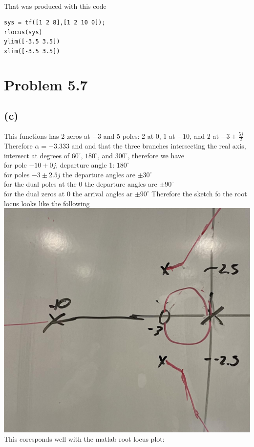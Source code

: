 \documentclass[12pt]{article}
\begin{document}
\\That was produced with this code
\begin{verbatim}
sys = tf([1 2 8],[1 2 10 0]);
rlocus(sys)
ylim([-3.5 3.5])
xlim([-3.5 3.5])
\end{verbatim}
\section*{Problem 5.7}
\subsection*{(c)}
This functions has 2 zeros at $-3$ and 5 poles: 2 at $0$, 1 at $-10$, and 2 at $-3\pm\frac{5j}{2}$
Therefore $\alpha=-3.333$ and and that the three branches intersecting the real axis, intersect at degrees of
$60^{\circ}$, $180^{\circ}$, and $300^{\circ}$,
therefore we have
\\for pole $-10+0j$, departure angle 1: $180^{\circ}$
\\for poles $-3\pm2.5j$ the departure angles are $\pm30^{\circ}$
\\for the dual poles at the $0$ the departure angles are $\pm90^{\circ}$
\\for the dual zeros at $0$ the arrival angles ar $\pm90^{\circ}$
Therefore the sketch fo the root locus looks like the following
\\
\includegraphics[scale=.15]{Problem2Sketch1.jpg}
\\This coresponds well with the matlab root locus plot:\\
\end{document}
